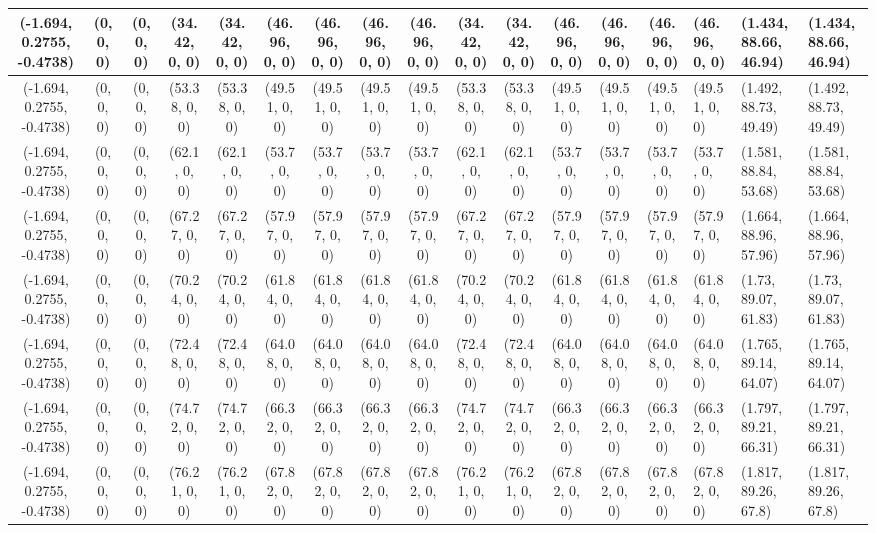 \begin{tabular}{| c | c | c | c | c | c | c | c | c | c | c | c | c | c |}
	(-1.694, 0.2755, -0.4738) & (0, 0, 0) & (0, 0, 0) & (34.42, 0, 0) & (34.42, 0, 0) & (46.96, 0, 0) & (46.96, 0, 0) & (46.96, 0, 0) & (46.96, 0, 0) & (34.42, 0, 0) & (34.42, 0, 0) & (46.96, 0, 0) & (46.96, 0, 0) & (46.96, 0, 0) & (46.96, 0, 0) & (1.434, 88.66, 46.94) & (1.434, 88.66, 46.94) \\ \hline
	(-1.694, 0.2755, -0.4738) & (0, 0, 0) & (0, 0, 0) & (53.38, 0, 0) & (53.38, 0, 0) & (49.51, 0, 0) & (49.51, 0, 0) & (49.51, 0, 0) & (49.51, 0, 0) & (53.38, 0, 0) & (53.38, 0, 0) & (49.51, 0, 0) & (49.51, 0, 0) & (49.51, 0, 0) & (49.51, 0, 0) & (1.492, 88.73, 49.49) & (1.492, 88.73, 49.49) \\ \hline
	(-1.694, 0.2755, -0.4738) & (0, 0, 0) & (0, 0, 0) & (62.1, 0, 0) & (62.1, 0, 0) & (53.7, 0, 0) & (53.7, 0, 0) & (53.7, 0, 0) & (53.7, 0, 0) & (62.1, 0, 0) & (62.1, 0, 0) & (53.7, 0, 0) & (53.7, 0, 0) & (53.7, 0, 0) & (53.7, 0, 0) & (1.581, 88.84, 53.68) & (1.581, 88.84, 53.68) \\ \hline
	(-1.694, 0.2755, -0.4738) & (0, 0, 0) & (0, 0, 0) & (67.27, 0, 0) & (67.27, 0, 0) & (57.97, 0, 0) & (57.97, 0, 0) & (57.97, 0, 0) & (57.97, 0, 0) & (67.27, 0, 0) & (67.27, 0, 0) & (57.97, 0, 0) & (57.97, 0, 0) & (57.97, 0, 0) & (57.97, 0, 0) & (1.664, 88.96, 57.96) & (1.664, 88.96, 57.96) \\ \hline
	(-1.694, 0.2755, -0.4738) & (0, 0, 0) & (0, 0, 0) & (70.24, 0, 0) & (70.24, 0, 0) & (61.84, 0, 0) & (61.84, 0, 0) & (61.84, 0, 0) & (61.84, 0, 0) & (70.24, 0, 0) & (70.24, 0, 0) & (61.84, 0, 0) & (61.84, 0, 0) & (61.84, 0, 0) & (61.84, 0, 0) & (1.73, 89.07, 61.83) & (1.73, 89.07, 61.83) \\ \hline
	(-1.694, 0.2755, -0.4738) & (0, 0, 0) & (0, 0, 0) & (72.48, 0, 0) & (72.48, 0, 0) & (64.08, 0, 0) & (64.08, 0, 0) & (64.08, 0, 0) & (64.08, 0, 0) & (72.48, 0, 0) & (72.48, 0, 0) & (64.08, 0, 0) & (64.08, 0, 0) & (64.08, 0, 0) & (64.08, 0, 0) & (1.765, 89.14, 64.07) & (1.765, 89.14, 64.07) \\ \hline
	(-1.694, 0.2755, -0.4738) & (0, 0, 0) & (0, 0, 0) & (74.72, 0, 0) & (74.72, 0, 0) & (66.32, 0, 0) & (66.32, 0, 0) & (66.32, 0, 0) & (66.32, 0, 0) & (74.72, 0, 0) & (74.72, 0, 0) & (66.32, 0, 0) & (66.32, 0, 0) & (66.32, 0, 0) & (66.32, 0, 0) & (1.797, 89.21, 66.31) & (1.797, 89.21, 66.31) \\ \hline
	(-1.694, 0.2755, -0.4738) & (0, 0, 0) & (0, 0, 0) & (76.21, 0, 0) & (76.21, 0, 0) & (67.82, 0, 0) & (67.82, 0, 0) & (67.82, 0, 0) & (67.82, 0, 0) & (76.21, 0, 0) & (76.21, 0, 0) & (67.82, 0, 0) & (67.82, 0, 0) & (67.82, 0, 0) & (67.82, 0, 0) & (1.817, 89.26, 67.8) & (1.817, 89.26, 67.8) \\ \hline

\end{tabular}
